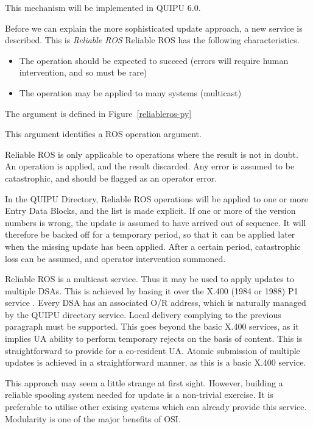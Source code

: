 This mechanism will be implemented in QUIPU 6.0.


Before we can explain the more sophisticated update approach, a new service
is described.  This is
{\em Reliable ROS}
Reliable ROS has the following characteristics.

\begin {itemize}
\item The operation should be expected to succeed (errors will require human
intervention, and so must be rare)
\item  The operation may be applied to many systems (multicast)
\end {itemize}

The argument is defined in Figure~\ref{reliableros-py}


This argument identifies a ROS operation argument.

Reliable ROS is only applicable to operations where the result is not in
doubt.   
An operation is applied, and the result discarded.   
Any error is assumed to be catastrophic, and should be flagged as an
operator error.

In the QUIPU Directory, Reliable ROS operations will be applied to one or
more Entry Data Blocks, and the list is made explicit.
If one or more of the version numbers is wrong, the update is assumed to
have arrived out of sequence.
It will therefore be backed off for a temporary period, so that it can
be applied later when the missing update has been applied.
After a certain period, catastrophic loss can be assumed, and operator
intervention summoned.

Reliable ROS is a multicast service.
Thus it may be used to apply updates to multiple DSAs.
This is achieved by basing it over the X.400 (1984 or 1988) P1 service 
\cite{CCITT.MHS.84} \cite{CCITT.X411.84}.
Every DSA has an associated O/R address, which is naturally managed by
the QUIPU directory service.
Local delivery complying to the previous paragraph must be supported.
This goes beyond the basic X.400 services, as it implies UA ability to
perform temporary rejects on the basis of content.
This is straightforward to provide for a co-resident UA.
Atomic submission of multiple updates is achieved in a straightforward
manner, as this is a basic X.400 service.

This approach may seem a little strange at first sight.
However, building a reliable spooling system needed for update is a
non-trivial exercise.
It is preferable to utilise other exising systems which can
already provide this service.
Modularity is one of the major benefits of OSI.


